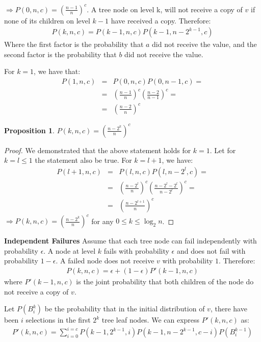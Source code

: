 \documentclass[11pt,twocolumn]{MyTightStyle}
\theoremstyle{plain}
\newtheorem{prop}[thm]{Proposition}
\theoremstyle{definition}
\theoremstyle{remark}
\numberwithin{equation}{section}
\begin{document}
  \noindent $\Rightarrow P(0,n,c)= (\frac{n-1}{n})^c$.
  A tree node on level k, will not receive a copy of $v$ if none of
  its children on level $k-1$ have received a copy. Therefore:
  \begin{eqnarray*}
    P(k,n,c) = P(k-1,n,c)P(k-1, n-2^{k-1},c)
  \end{eqnarray*}
  Where the first factor is the probability that $a$ did not receive
  the value, and the second factor is the probability that $b$ did not
  receive the value.

  For $k =1$, we have that:
  \begin{eqnarray*}
    P(1, n,c) &=& P(0, n,c)P(0, n-1,c) = \\
    &=&(\frac{n-1}{n})^c(\frac{n-2}{n-1})^c=\\
    &=&(\frac{n-2}{n})^c
  \end{eqnarray*}

  \begin{prop}
    $P(k,n,c) = (\frac{n-2^k}{n})^c$
  \end{prop}

  \begin{proof}
    We demonstrated that the above statement holds for $k=1$. Let
    for $k=l \leq 1$ the statement also be true. For $k=l+1$, we have:
    \begin{eqnarray*}
      P(l+1,n,c) &=& P(l,n,c)P(l, n-2^{l},c) = \\
      &=& (\frac{n-2^l}{n})^c(\frac{n-2^{l}-2^{l}}{n-2^l})^c =\\
      &=& (\frac{n-2^{l+1}}{n})^c
    \end{eqnarray*}
    $\Rightarrow P(k,n,c) = (\frac{n-2^k}{n})^c$ for any $0 \leq k
    \leq \log_2n$. 
  \end{proof}

  {\bf Independent Failures} Assume that each tree node can fail
  independently with probability $\epsilon$. A node at level $k$ fails
  with probability $\epsilon$ and  does not fail with probability
  $1-\epsilon$. A failed node does not receive $v$ with probability
  $1$. Therefore:
  \begin{eqnarray*}
    P(k,n,c) = \epsilon + (1-\epsilon)P'(k-1, n, c)
  \end{eqnarray*}
  where $P'(k-1,n,c)$ is the joint probability that both children of
  the node do not receive a copy of $v$.

  Let $P(B_i^k)$ be the probability that in the initial distribution
  of $v$, there have been $i$ selections in the first $2^k$ tree leaf
  nodes. We can express $P'(k,n,c)$ as:
  \begin{eqnarray*}
    P'(k, n, c) = \sum_{i=0}^{i=c}P(k-1,2^{k-1},i)P(k-1, n-2^{k-1}, c-i)P(B_i^{k-1})
  \end{eqnarray*}
\end{document}
